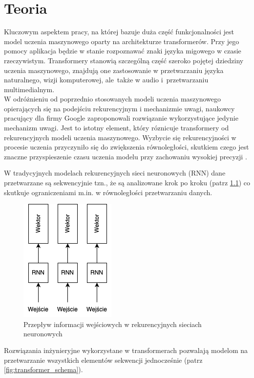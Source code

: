 \chapter{Teoria}

Kluczowym aspektem pracy, na której bazuje duża część funkcjonalności jest model uczenia maszynowego oparty na architekturze transformerów. 
Przy jego pomocy aplikacja będzie w stanie rozpoznawać znaki języka migowego w czasie rzeczywistym.
Transformery stanowią szczególną część szeroko pojętej dziedziny uczenia maszynowego, znajdują one zastosowanie w przetwarzaniu języka naturalnego, wizji komputerowej, ale~także w audio i~przetwarzaniu multimedialnym. \\
W odróżnieniu od poprzednio stosowanych modeli uczenia maszynowego opierających się na podejściu rekurencyjnym i mechanizmie uwagi, naukowcy pracujący dla firmy Google zaproponowali rozwiązanie wykorzystujące jedynie mechanizm uwagi. 
Jest to istotny element, który róznicuje transformery od rekurencyjnych modeli uczenia maszynowego.
Wyzbycie się rekurencyjności w procesie uczenia przyczyniło się do zwiększenia równoległości, skutkiem czego jest znaczne przyspieszenie czasu uczenia modelu przy zachowaniu wysokiej precyzji \cite{vaswani2023attentionneed}.

W tradycyjnych modelach rekurencyjnych sieci neuronowych (RNN) dane przetwarzane są sekwencyjnie tzn., że są analizowane krok po kroku (patrz \ref{fig:rnn_schema}) \cite{mamczur2020} co skutkuje ograniczeniami m.in. w równoległości przetwarzaniu danych.


\begin{figure}[H]
    \centering
	\includegraphics[scale=0.60]{figs/rnn.png}
	\caption{Przepływ informacji wejściowych w rekurencyjnych sieciach neuronowych}
	\label{fig:rnn_schema}
\end{figure}

Rozwiązania inżynieryjne wykorzystane w transformerach pozwalają modelom na przetwarzanie wszystkich elementów sekwencji jednocześnie (patrz \ref{fig:transformer_schema}).

